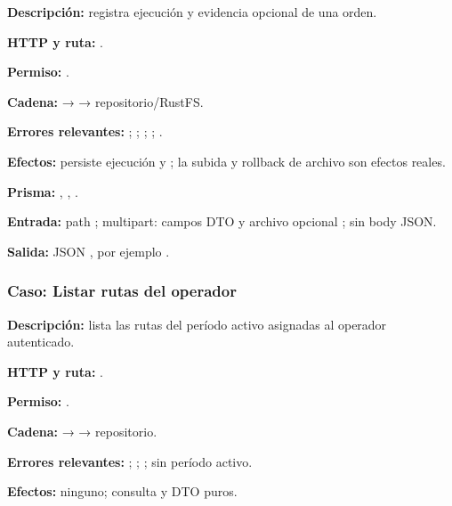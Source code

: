 \textbf{Descripción:} registra ejecución y evidencia opcional de una orden.  

\textbf{HTTP y ruta:} \texttt{}.  

\textbf{Permiso:} \texttt{}.  

\textbf{Cadena:} \texttt{} → \texttt{} → repositorio/RustFS.  

\textbf{Errores relevantes:} \texttt{}; \texttt{}; \texttt{}; \texttt{}; \texttt{}.  

\textbf{Efectos:} persiste ejecución y \texttt{}; la subida y rollback de archivo son efectos reales.  

\textbf{Prisma:} \texttt{}, \texttt{}, \texttt{}.  

\textbf{Entrada:} path \texttt{}; multipart: campos DTO y archivo opcional \texttt{}; sin body JSON.  

\textbf{Salida:} JSON \texttt{}, por ejemplo \texttt{}.


\subsubsection{Caso: Listar rutas del operador}


\textbf{Descripción:} lista las rutas del período activo asignadas al operador autenticado.  

\textbf{HTTP y ruta:} \texttt{}.  

\textbf{Permiso:} \texttt{}.  

\textbf{Cadena:} \texttt{} → \texttt{} → repositorio.  

\textbf{Errores relevantes:} \texttt{}; \texttt{}; \texttt{}; \texttt{} sin período activo.  

\textbf{Efectos:} ninguno; consulta y DTO puros.  

